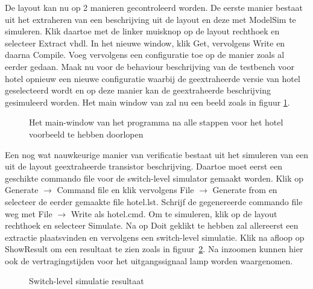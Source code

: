 De layout kan nu op 2 manieren gecontroleerd worden.
De eerste manier bestaat uit het extraheren van een  beschrijving
uit de layout en deze met ModelSim te simuleren.
Klik daartoe met de linker muisknop op de layout rechthoek en selecteer Extract vhdl.
In het nieuwe window, klik Get, vervolgens Write en daarna Compile.
Voeg vervolgens een configuratie toe op de manier
zoals al eerder gedaan.
Maak nu voor de behaviour beschrijving van de testbench voor hotel
opnieuw een nieuwe configuratie waarbij de geextraheerde versie van hotel
geselecteerd wordt en op deze manier kan 
de geextraheerde  beschrijving gesimuleerd worden.
Het main window van  zal nu een beeld zoals in figuur \ref{main-window_end}.
\begin{figure}[htbp]
  \centerline{}
  \caption{Het main-window van het programma  na alle stappen voor het hotel voorbeeld te hebben doorlopen}
  \label{main-window_end}
\end{figure}
\FloatBarrier

Een nog wat nauwkeurige manier van verificatie bestaat uit het simuleren
van een uit de layout geextraheerde transistor beschrijving.
Daartoe moet eerst een geschikte commando file voor de switch-level
simulator gemaakt worden.
Klik op Generate $\rightarrow$ Command file en klik vervolgens 
File $\rightarrow$ Generate from en selecteer
de eerder gemaakte file hotel.lst.
Schrijf de gegenereerde commando file weg met File $\rightarrow$ Write
als hotel.cmd.
Om te simuleren, klik op
de layout rechthoek en selecteer Simulate.
Na op Doit geklikt te hebben zal allereerst een extractie plaatsvinden en
vervolgens een switch-level simulatie.
Klik na afloop op ShowResult om een resultaat te zien zoals in figuur~\ref{slswaves}.
Na inzoomen kunnen hier ook de vertra\-gings\-tijden voor het uitgangssignaal
lamp worden waargenomen.
\begin{figure}[h]
  \centerline{}
  \caption{Switch-level simulatie resultaat}
  \label{slswaves}
\end{figure}
\FloatBarrier

